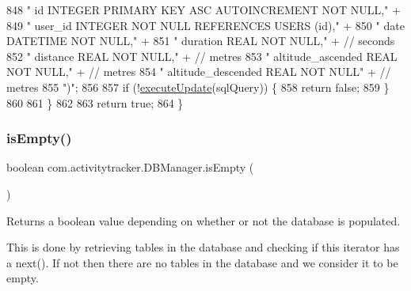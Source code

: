 \begin{DoxyCode}
848                     \textcolor{stringliteral}{"    id                  INTEGER PRIMARY KEY ASC AUTOINCREMENT NOT NULL,"} +
849                     \textcolor{stringliteral}{"    user\_id             INTEGER NOT NULL REFERENCES USERS (id),"} +
850                     \textcolor{stringliteral}{"    date                DATETIME    NOT NULL,"} +
851                     \textcolor{stringliteral}{"    duration            REAL    NOT NULL,"} + \textcolor{comment}{// seconds}
852                     \textcolor{stringliteral}{"    distance            REAL    NOT NULL,"} + \textcolor{comment}{// metres}
853                     \textcolor{stringliteral}{"    altitude\_ascended   REAL    NOT NULL,"} + \textcolor{comment}{// metres}
854                     \textcolor{stringliteral}{"    altitude\_descended  REAL    NOT NULL"} + \textcolor{comment}{// metres}
855                     \textcolor{stringliteral}{")"};
856 
857             \textcolor{keywordflow}{if} (!\mbox{\hyperlink{classcom_1_1activitytracker_1_1_d_b_manager_a382397e2bdf309901d1c80ff66be69b7}{executeUpdate}}(sqlQuery)) \{
858                 \textcolor{keywordflow}{return} \textcolor{keyword}{false};
859             \}
860 
861         \}
862 
863         \textcolor{keywordflow}{return} \textcolor{keyword}{true};
864     \}
\end{DoxyCode}
\mbox{\label{classcom_1_1activitytracker_1_1_d_b_manager_af9ab112f840e3c803b6b28a2f1a15215}} 
\subsubsection{\texorpdfstring{is\+Empty()}{isEmpty()}}
{\footnotesize\ttfamily boolean com.\+activitytracker.\+D\+B\+Manager.\+is\+Empty (\begin{DoxyParamCaption}{ }\end{DoxyParamCaption})\hspace{0.3cm}{\ttfamily [private]}}

Returns a boolean value depending on whether or not the database is populated.

This is done by retrieving tables in the database and checking if this iterator has a next(). If not then there are no tables in the database and we consider it to be empty.

